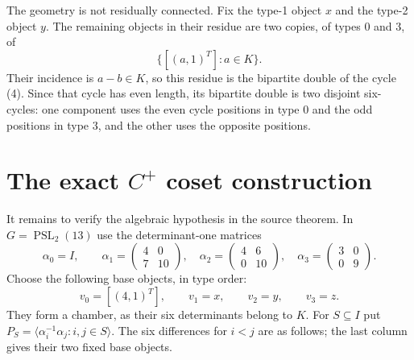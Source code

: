 \documentclass[11pt,a4paper]{article}
\newcommand{\gen}[1]{\langle #1\rangle}
\begin{document}
The geometry is not residually connected. Fix the type-1 object
$x$ and the type-2 object $y$. The remaining objects in their
residue are two copies, of types 0 and 3, of
\[
                   \{[(a,1)^T]:a\in K\}.
\]
Their incidence is $a-b\in K$, so this residue is the bipartite
double of the cycle (4). Since that cycle has even length, its
bipartite double is two disjoint six-cycles: one component uses
the even cycle positions in type 0 and the odd positions in
type 3, and the other uses the opposite positions.

\section{The exact \texorpdfstring{$C^+$}{C-plus} coset construction}
It remains to verify the algebraic hypothesis in the source theorem.
In $G=\operatorname{PSL}_2(13)$ use the determinant-one matrices
\[
 \alpha_0=I,\qquad
 \alpha_1=\begin{pmatrix}4&0\\7&10\end{pmatrix},\quad
 \alpha_2=\begin{pmatrix}4&6\\0&10\end{pmatrix},\quad
 \alpha_3=\begin{pmatrix}3&0\\0&9\end{pmatrix}.             \tag{6}
\]
Choose the following base objects, in type order:
\[
       v_0=[(4,1)^T],\qquad v_1=x,
       \qquad v_2=y,\qquad v_3=z.                        \tag{7}
\]
They form a chamber, as their six determinants belong to $K$.
For $S\subseteq I$ put
$P_S=\gen{\alpha_i^{-1}\alpha_j:i,j\in S}$.
The six differences for $i<j$ are as follows; the last column
gives their two fixed base objects.
\end{document}
